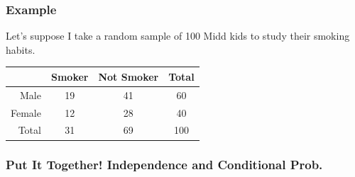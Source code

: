 \documentclass[handout]{beamer}
\begin{document}
\begin{frame}
\frametitle{Example}
Let's suppose I take a random sample of 100 Midd kids to study their smoking habits.

\begin{center}
  \begin{tabular}{r|cc|c}
	&Smoker&Not Smoker&Total\\
	\hline
Male&19&41&60\\
Female&12&28&40\\
\hline
Total&31&69&100\\
\end{tabular}
\end{center}

%
%

\end{frame}


\begin{frame}
\frametitle{Put It Together!  Independence and Conditional Prob.}
%
%
%
%
%
%

\end{frame}
\end{document}

